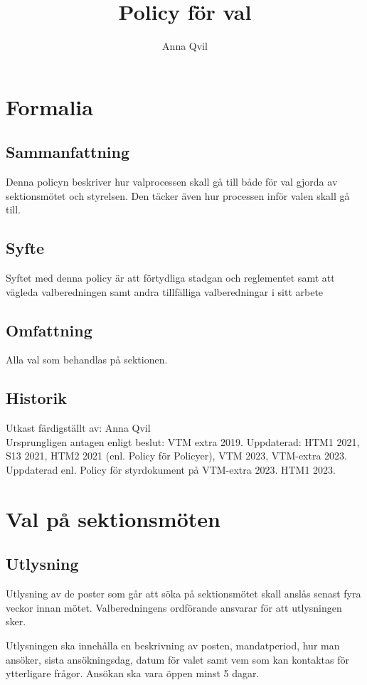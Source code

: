 \documentclass{dsekprotokoll}
\title{Policy för val}
\author{Anna Qvil}
\begin{document}
\maketitle
\section{Formalia}
\subsection{Sammanfattning}
Denna policyn beskriver hur valprocessen skall gå till både för val gjorda av sektionsmötet och styrelsen. Den täcker även hur processen inför valen skall gå till.

\subsection{Syfte}
Syftet med denna policy är att förtydliga stadgan och reglementet samt att vägleda valberedningen samt andra tillfälliga valberedningar i sitt arbete

\subsection{Omfattning}
Alla val som behandlas på sektionen.

\subsection{Historik}
Utkast färdigställt av: Anna Qvil \\
Ursprungligen antagen enligt beslut: VTM extra 2019.
Uppdaterad: HTM1 2021, S13 2021, HTM2 2021 (enl. Policy för Policyer), VTM 2023, VTM-extra 2023. Uppdaterad enl. Policy för styrdokument på VTM-extra 2023. HTM1 2023.


\section{Val på sektionsmöten}

\subsection{Utlysning}
Utlysning av de poster som går att söka på sektionsmötet skall anslås senast fyra veckor innan mötet. Valberedningens ordförande ansvarar för att utlysningen sker.

Utlysningen ska innehålla en beskrivning av posten, mandatperiod, hur man ansöker, sista  ansökningsdag, datum för valet samt vem som kan kontaktas för ytterligare frågor. Ansökan ska vara öppen minst 5 dagar.
\end{document}
